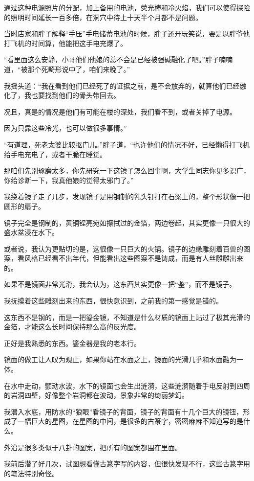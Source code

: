 通过这种电源照片的分配，加上备用的电池，荧光棒和冷火焰，我们可以使得探险的照明时间延长一百多倍，在洞穴中待上十天半个月都不是问题。

当时店家和胖子解释“手压”手电储蓄电池的时候，胖子还开玩笑说，要是以胖爷他打飞机的时间算，他能把这手电充爆了。

“看里面这么安静，小哥他们他娘的总不会是已经被强碱融化了吧。”胖子喃喃道，“被那个死畸形说中了，咱们来晚了。”

我摇头道：“我在看到他们已经死了的证据之前，是不会放弃的，就算他们已经融化了，我也要找到他们的骨头带回去。

况且，真是的情况是他们有可能在楼的深处，我们看不到，或者关掉了电源。

因为只靠这些冷光，也可以做很多事情。”

“有道理，死老太婆比较抠门儿。”胖子道，“也许他们的情况不好，已经懒得打飞机给手电充电了，或者干脆在睡觉。

那咱们先别琢磨太多，你先研究一下这镜子怎么回事啊，大学生同志你见多识广，你给诊断一下，我真他娘的觉得太邪门了。”

我绕着镜子走了几步，发现镜子是用钢制的乳头钉打在石梁上的，整个形状像一把圆形的扇子。

镜子完全是钢制的，黄铜锃亮宛如擦拭过的金箔，两边卷起，其实更像一只很大的盛水盆浸在水下。

或者说，我认为更贴切的是，这很像一只巨大的火锅。镜子的边缘雕刻着百兽的图案，看风格已经看不出年代，但能看出这些图案不是铸成，而是有人丝雕雕出来的。

如果不是镜面非常光滑，我会认为，这东西其实更像一把“鉴”，而不是镜子。

我抚摸着这些雕刻出来的东西，很快意识到，之前我的第一感觉是错的。

这东西不是钢的，而是一把鎏金镜，不知道是什么材质的镜面上贴过了极其光滑的金箔，才能这么长时间保持那么高的反光度。

正好是我熟悉的东西。鎏金器是我的老本行。

镜面的做工让人叹为观止，如果你站在水面之上，镜面的光滑几乎和水面融为一体。

在水中走动，颤动水波，水下的镜面也会生出涟漪，这些涟漪随着手电反射到四周的岩洞四壁，好像整个岩洞都在波动，景象非常的绮丽梦幻。

我潜入水底，用防水的“狼眼”看镜子的背面，镜子的背面有十几个巨大的镜钮，形成了一幅巨大的星图，在星图的中间，是很多的古篆字，密密麻麻不知道写的是什么。

外沿是很多类似于八卦的图案，把所有的图案都围在里面。

我前后潜了好几次，试图想看懂古篆字写的内容，但很快发现不行，这些古篆字用的笔法特别奇怪。

